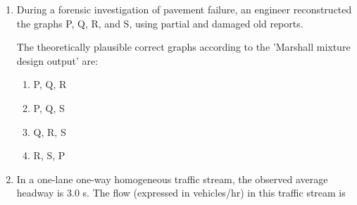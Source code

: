 \documentclass[journal]{IEEEtran}
\begin{document}
\begin{enumerate}
\begin{multicols}{2}
\begin{enumerate}
\begin{enumerate}
                    \item R. Conventional nitrification
                    \item S. Biological nitrogen removal
                \end{enumerate}
            \item \underline{Group II}:
                \begin{enumerate}
                    \item 1. Nitrifiers and denitrifiers
                    \item 2. Autotrophic bacteria
                    \item 3. Heterotrophic bacteria
                    \item 4. Denitrifiers
                \end{enumerate}
        \end{enumerate}
            \end{multicols}
        The correct answer is:
        \begin{multicols}{2}
        \begin{enumerate}
            \item  P-3, Q-4, R-2, S-1
            \item  P-2, Q-3, R-4, S-1
            \item  P-3, Q-2, R-4, S-1
            \item  P-1, Q-4, R-2, S-3
        \end{enumerate}
                \end{multicols}
    \item During a forensic investigation of pavement failure, an engineer reconstructed the graphs P, Q, R, and S, using partial and damaged old reports. 
      \begin{figure}[H]
        \centering
         
    \end{figure}
    The theoretically plausible correct graphs according to the 'Marshall mixture design output' are:
    \begin{multicols}{4}
        \begin{enumerate}
            \item  P, Q, R
            \item  P, Q, S
            \item  Q, R, S
            \item  R, S, P
        \end{enumerate}
            \end{multicols}
    \item In a one-lane one-way homogeneous traffic stream, the observed average headway is 3.0 s. The flow (expressed in vehicles/hr) in this traffic stream is \underline{\hspace{1cm}}

\end{enumerate}
\end{document}
